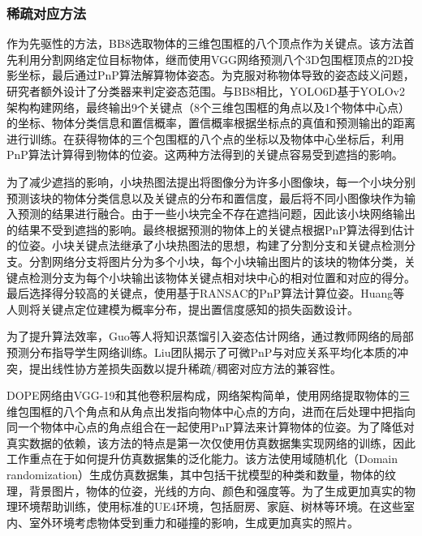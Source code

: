 \subsubsection{稀疏对应方法}\label{稀疏对应方法}
作为先驱性的方法，BB8\cite{rad2017bb8}选取物体的三维包围框的八个顶点作为关键点。该方法首先利用分割网络定位目标物体，继而使用VGG网络\cite{VGG}预测八个3D包围框顶点的2D投影坐标，最后通过PnP算法\cite{EPnP}解算物体姿态。为克服对称物体导致的姿态歧义问题，研究者额外设计了分类器来判定姿态范围。与BB8相比，YOLO6D\cite{tekin2018real}基于YOLOv2架构\cite{YOLO}构建网络，最终输出9个关键点（8个三维包围框的角点以及1个物体中心点）的坐标、物体分类信息和置信概率，置信概率根据坐标点的真值和预测输出的距离进行训练。在获得物体的三个包围框的八个点的坐标以及物体中心坐标后，利用PnP算法\cite{RANSAC}计算得到物体的位姿。这两种方法得到的关键点容易受到遮挡的影响。

为了减少遮挡的影响，小块热图法\cite{oberweger2018making}提出将图像分为许多小图像块，每一个小块分别预测该块的物体分类信息以及关键点的分布和置信度，最后将不同小图像块作为输入预测的结果进行融合。由于一些小块完全不存在遮挡问题，因此该小块网络输出的结果不受到遮挡的影响。最终根据预测的物体上的关键点根据PnP算法得到估计的位姿。小块关键点法\cite{Hu2019Segmentation}继承了小块热图法的思想，构建了分割分支和关键点检测分支。分割网络分支将图片分为多个小块，每个小块输出图片的该块的物体分类，关键点检测分支为每个小块输出该物体关键点相对块中心的相对位置和对应的得分。最后选择得分较高的关键点，使用基于RANSAC的PnP算法计算位姿。Huang等人\cite{Huang2021Confidence}则将关键点定位建模为概率分布，提出置信度感知的损失函数设计。

为了提升算法效率，Guo等人\cite{guo2023knowledge}将知识蒸馏引入姿态估计网络，通过教师网络的局部预测分布指导学生网络训练。Liu团队\cite{liu2023linear}揭示了可微PnP与对应关系平均化本质的冲突，提出线性协方差损失函数以提升稀疏/稠密对应方法的兼容性。

\par DOPE\cite{dope}网络由VGG-19\cite{VGG}和其他卷积层构成，网络架构简单，使用网络提取物体的三维包围框的八个角点和从角点出发指向物体中心点的方向，进而在后处理中把指向同一个物体中心点的角点组合在一起使用PnP算法来计算物体的位姿。为了降低对真实数据的依赖，该方法的特点是第一次仅使用仿真数据集实现网络的训练，因此工作重点在于如何提升仿真数据集的泛化能力。该方法使用域随机化（Domain randomization）生成仿真数据集，其中包括干扰模型的种类和数量，物体的纹理，背景图片，物体的位姿，光线的方向、颜色和强度等。为了生成更加真实的物理环境帮助训练，使用标准的UE4环境，包括厨房、家庭、树林等环境。在这些室内、室外环境考虑物体受到重力和碰撞的影响，生成更加真实的照片。

